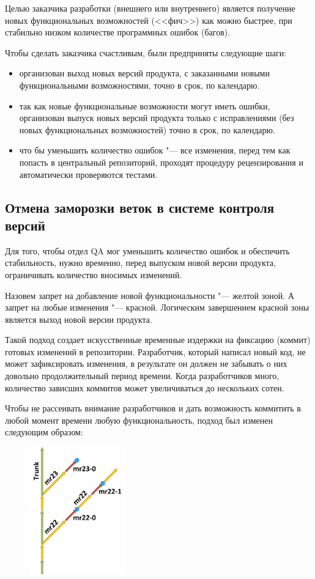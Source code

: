 \documentclass[10pt, a5paper]{article}
\begin{document}
Целью заказчика разработки (внешнего или внутреннего) является получение новых функциональных возможностей (<<фич>>) как можно быстрее, при стабильно низком количестве программных ошибок (багов).

Чтобы сделать заказчика счастливым, были предприняты следующие шаги:

\begin{itemize}
  \item организован выход новых версий продукта, с заказанными новыми функциональными возможностями, точно в срок, по календарю.
  \item так как новые функциональные возможности могут иметь \linebreak ошибки, организован выпуск новых версий продукта только с исправлениями (без новых функциональных возможностей) точно в срок, по календарю.
  \item что бы уменьшить количество ошибок "--- все изменения, перед тем как попасть в центральный репозиторий, проходят процедуру рецензирования и автоматически проверяются тестами.
\end{itemize}

\subsection*{Отмена заморозки веток в системе контроля версий}

Для того, чтобы отдел QA мог уменьшить количество ошибок и обеспечить стабильность, нужно временно, перед выпуском новой версии продукта, ограничивать количество вносимых изменений.

Назовем запрет на добавление новой функциональности "--- желтой зоной. А запрет на любые изменения "--- красной. Логическим завершением красной зоны является выход новой версии продукта.

Такой подход создает искусственные временные издержки на фиксацию (коммит)  готовых изменений в репозитории. Разработчик, который написал новый код, не может зафиксировать изменения, в результате он должен не забывать о них довольно продолжительный период времени. Когда разработчиков много, количество зависших коммитов может увеличиваться до нескольких сотен.

Чтобы не рассеивать внимание разработчиков и дать возможность коммитить в любой момент времени любую функциональность, подход был изменен следующим образом:

\begin{figure}
  \centering
  \includegraphics[height=5.5cm]{05_zones_old.png}
\end{figure}
\end{document}
